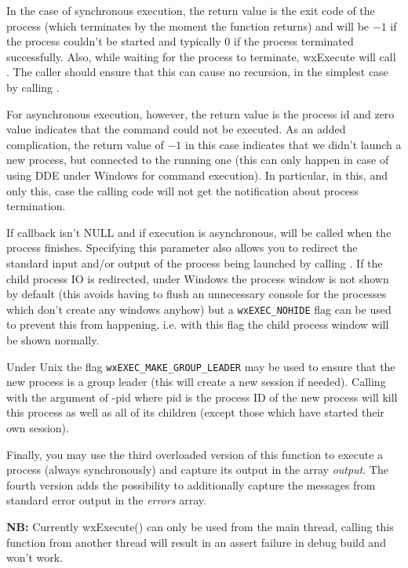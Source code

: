 In the case of synchronous execution, the return value is the exit code of
the process (which terminates by the moment the function returns) and will be
$-1$ if the process couldn't be started and typically 0 if the process
terminated successfully. Also, while waiting for the process to
terminate, wxExecute will call . The caller
should ensure that this can cause no recursion, in the simplest case by
calling .

For asynchronous execution, however, the return value is the process id and
zero value indicates that the command could not be executed. As an added
complication, the return value of $-1$ in this case indicates that we didn't
launch a new process, but connected to the running one (this can only happen in
case of using DDE under Windows for command execution). In particular, in this,
and only this, case the calling code will not get the notification about
process termination.

If callback isn't NULL and if execution is asynchronous,
 will be called when
the process finishes. Specifying this parameter also allows you to redirect the
standard input and/or output of the process being launched by calling
. If the child process IO is redirected,
under Windows the process window is not shown by default (this avoids having to
flush an unnecessary console for the processes which don't create any windows
anyhow) but a {\tt wxEXEC\_NOHIDE} flag can be used to prevent this from
happening, i.e. with this flag the child process window will be shown normally.

Under Unix the flag {\tt wxEXEC\_MAKE\_GROUP\_LEADER} may be used to ensure
that the new process is a group leader (this will create a new session if
needed). Calling  with the argument of -pid where pid
is the process ID of the new process will kill this process as well as all of
its children (except those which have started their own session).

Finally, you may use the third overloaded version of this function to execute
a process (always synchronously) and capture its output in the array
{\it output}. The fourth version adds the possibility to additionally capture
the messages from standard error output in the {\it errors} array.

{\bf NB:} Currently wxExecute() can only be used from the main thread, calling
this function from another thread will result in an assert failure in debug
build and won't work.

